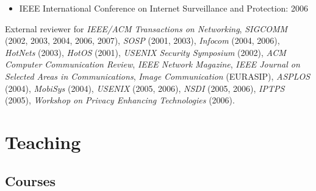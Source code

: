 \documentclass{article}
\begin{document}
\begin{cv}{}
\begin{itemize}
\item IEEE International Conference on Internet Surveillance and Protection: 2006

\end{itemize}

\noindent
External reviewer for {\em IEEE/ACM Transactions on Networking}, {\em
SIGCOMM} (2002, 2003, 2004, 2006, 2007), {\em SOSP} (2001, 2003), {\em
Infocom} (2004, 2006), {\em HotNets} (2003), {\em HotOS} (2001), {\em
USENIX Security Symposium} (2002), {\em ACM Computer Communication
Review}, {\em IEEE Network Magazine}, {\em IEEE Journal on Selected
Areas in Communications}, {\em Image Communication} (EURASIP), {\em
ASPLOS} (2004), {\em MobiSys} (2004), {\em USENIX} (2005, 2006), {\em
NSDI} (2005, 2006), {\em IPTPS} (2005), {\em Workshop on Privacy
  Enhancing Technologies} (2006).  \\



\section*{Teaching}

\subsection*{Courses}
\label{subsec:courses}


\end{cv}
\end{document}
